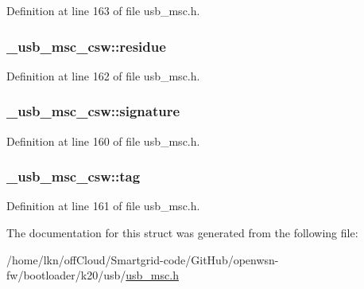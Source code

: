 Definition at line 163 of file usb\+\_\+msc.\+h.

\subsubsection[{\texorpdfstring{residue}{residue}}]{ \+\_\+usb\+\_\+msc\+\_\+csw\+::residue}\hypertarget{struct__usb__msc__csw_a2b5c6adf9c77740bee212de92ac6434d}{}\label{struct__usb__msc__csw_a2b5c6adf9c77740bee212de92ac6434d}


Definition at line 162 of file usb\+\_\+msc.\+h.

\subsubsection[{\texorpdfstring{signature}{signature}}]{ \+\_\+usb\+\_\+msc\+\_\+csw\+::signature}\hypertarget{struct__usb__msc__csw_ada17b13d30a4fbe2369de6924ac6fb2f}{}\label{struct__usb__msc__csw_ada17b13d30a4fbe2369de6924ac6fb2f}


Definition at line 160 of file usb\+\_\+msc.\+h.

\subsubsection[{\texorpdfstring{tag}{tag}}]{ \+\_\+usb\+\_\+msc\+\_\+csw\+::tag}\hypertarget{struct__usb__msc__csw_a42b2f6bae52fb9948d573035e70fb903}{}\label{struct__usb__msc__csw_a42b2f6bae52fb9948d573035e70fb903}


Definition at line 161 of file usb\+\_\+msc.\+h.



The documentation for this struct was generated from the following file\+:\begin{DoxyCompactItemize}
\item 
/home/lkn/off\+Cloud/\+Smartgrid-\/code/\+Git\+Hub/openwsn-\/fw/bootloader/k20/usb/\hyperlink{usb__msc_8h}{usb\+\_\+msc.\+h}\end{DoxyCompactItemize}
